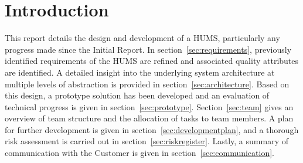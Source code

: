 \section{Introduction}
\label{sec:introduction}

This report details the design and development of a HUMS, particularly any progress made since the Initial Report. In section~\ref{sec:requirements}, previously identified requirements of the HUMS are refined and associated quality attributes are identified. A detailed insight into the underlying system architecture at multiple levels of abstraction is provided in section~\ref{sec:architecture}. Based on this design, a prototype solution has been developed and an evaluation of technical progress is given in section~\ref{sec:prototype}. Section~\ref{sec:team} gives an overview of team structure and the allocation of tasks to team members. A plan for further development is given in section~\ref{sec:developmentplan}, and a thorough risk assessment is carried out in section~\ref{sec:riskregister}. Lastly, a summary of communication with the Customer is given in section~\ref{sec:communication}.
